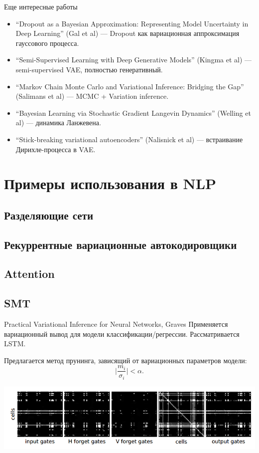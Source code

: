 \documentclass[10pt,pdf,utf8,russian,aspectratio=169]{beamer}
\begin{document}
\begin{frame}{Еще интересные работы}
\begin{itemize}
\item ``Dropout as a Bayesian Approximation: Representing Model Uncertainty in Deep Learning'' (Gal et al) --- Dropout как вариационная аппроксимация гауссового процесса.
\item ``Semi-Supervised Learning with Deep Generative Models'' (Kingma et al) --- semi-supervised VAE, полностью генеративный.
\item ``Markov Chain Monte Carlo and Variational Inference: Bridging the Gap'' (Salimans et al) --- MCMC + Variation inference.
\item  ``Bayesian Learning via Stochastic Gradient Langevin Dynamics'' (Welling et al) --- динамика Ланжевена.
\item ``Stick-breaking variational autoencoders'' (Nalisnick et al) --- встраивание Дирихле-процесса в VAE. 
\end{itemize}
\end{frame}
\section{Примеры использования в NLP}
\subsection{Разделяющие сети}
\subsection{Рекуррентные вариационные автокодировщики}
\subsection{Attention}
\subsection{SMT}



\begin{frame}{Practical Variational Inference for Neural Networks, Graves}
Применяется вариационный вывод для модели классификации/регрессии. Рассматривается LSTM.

Предлагается метод прунинга, зависящий от вариационных параметров модели:
\[
\bigl|\frac{m_i}{\sigma_i}\bigr|<\alpha.
\]

\includegraphics[width=\textwidth]{graves.png}

\end{frame}
\end{document}
